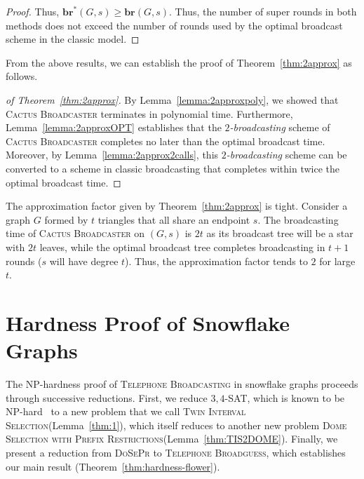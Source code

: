 \documentclass[letterpaper,11pt]{article}
\newcommand{\flower}{snowflake\xspace}
\newcommand{\Flower}{Snowflake\xspace}
\newcommand{\twofast}{\textit{$2$-broadcasting}\xspace}
\newcommand{\br}{\boldsymbol{br}}
\newcommand{\bropt}{{\boldsymbol{br}^*}}
\newcommand{\telebr}{\textsc{Telephone Broadcasting}\xspace}
\newcommand{\sssattt}{\textsc{$3,4$-SAT}\xspace}
\newcommand{\tislong}{\textsc{Twin Interval Selection}\xspace}
\newcommand{\dspr}{\textsc{DoSePr}\xspace}
\newcommand{\dsprlong}{\textsc{Dome Selection with Prefix Restrictions}\xspace}
\newcommand{\telebg}{\textsc{Telephone Broadguess}\xspace}
\newcommand{\ouralgo}{\textsc{Cactus Broadcaster}\xspace}
\begin{document}
\begin{proof}
    \scalebox{.9}{
    \begin{minipage}{1.2\textwidth}
    \begin{align*}
        \bropt(G,s) &\geq \max_i (b_i + \pi^1_i) \\
        &\geq \min_{\pi'} (\max_i (b_i + \pi'_i))\\
        &= \br(G,s).
    \end{align*}
    \vspace{1mm}
\end{minipage}}
    Thus, $\bropt(G,s) \geq \br(G,s)$. Thus, the number of super rounds in both methods does not exceed the number of rounds used by the optimal broadcast scheme in the classic model.
\end{proof}

From the above results, we can establish the proof of Theorem~\ref{thm:2approx} as follows.

\begin{proof}[of Theorem~\ref{thm:2approx}]
\label{proof:2approx}
    By Lemma~\ref{lemma:2approxpoly}, we showed that \ouralgo terminates in polynomial time. Furthermore, Lemma~\ref{lemma:2approxOPT} establishes that the \twofast scheme of \ouralgo completes no later than the optimal broadcast time. Moreover, by Lemma~\ref{lemma:2approx2calls}, this \twofast scheme can be converted to a scheme in classic broadcasting that completes within twice the optimal broadcast time.   
\end{proof}

The approximation factor given by Theorem~\ref{thm:2approx} is tight. Consider a graph $G$ formed by $t$ triangles that all share an endpoint $s$. The broadcasting time of \ouralgo on $(G,s)$ is $2t$ as its broadcast tree will be a star with $2t$ leaves, while the optimal broadcast tree completes broadcasting in $t+1$ rounds ($s$ will have degree $t$). 
Thus, the approximation factor tends to $2$ for large $t$. 



 \section{Hardness Proof of \Flower Graphs}
\label{sec:hardness}

The NP-hardness proof of \telebr in \flower graphs proceeds through successive reductions. First, we reduce \sssattt, which is known to be NP-hard~\cite{tovey1984simplified} to a new problem that we call \tislong (Lemma~\ref{thm:1}), which itself reduces to another new problem \dsprlong (Lemma~\ref{thm:TIS2DOME}). Finally, we present a reduction from \dspr to \telebg, which establishes our main result (Theorem~\ref{thm:hardness-flower}).
\end{document}
